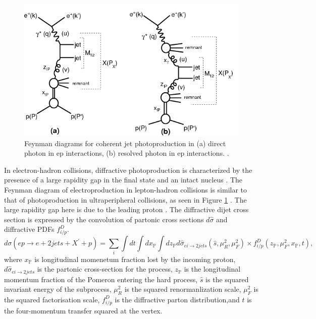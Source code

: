 \begin{figure}[]
\begin{centering}
\includegraphics[width=6in]{Chapter1/importfigs/h1_2015_feyn.png}
\par\end{centering}
\caption{Feynman diagrams for coherent jet photoproduction in (a) direct photon in ep interactions, (b) resolved photon in ep interactions. \cite{Andreev:2015cwa}. \label{fig:feynmanUPC1}}
\end{figure}

In electron-hadron collisions, diffractive photoproduction is characterized by the presence of a large rapidity gap in the final state and an intact nucleus \cite{Frankfurt:2006tp,Alexa:2013xxa,Aktas:2006qs}. The Feynman diagram of electroproduction in lepton-hadron collisions is similar to that of photoproduction in ultraperipheral collisions, as seen in Figure \ref{fig:feynmanUPC1} \cite{Andreev:2015cwa}. The large rapidity gap here is due to the leading proton \cite{Aaron:2010aa}. The diffractive dijet cross section is expressed by the convolution of partonic cross sections $d\hat{\sigma}$ and diffractive PDFs $f^D_{i/p}$.
\begin{equation}
d\sigma (ep \rightarrow e + 2 jets + X^{'} + p) = \sum_{i} \int dt \int dx_\mathbb{P} \int dz_\mathbb{P}d\hat{\sigma}_{ei\rightarrow 2jets}(\hat{s},\mu^2_R,\mu^2_F)\times f^D_{i/p}(z_\mathbb{P},\mu^2_F,x_\mathbb{P},t) ,
\end{equation}
where $x_\mathbb{P}$ is longitudinal momenetum fraction lost by the incoming proton, $d\hat{\sigma}_{ei\rightarrow 2jets}$ is the partonic cross-section for the process, $z_\mathbb{P}$ is the longitudinal momentum fraction of the Pomeron entering the hard process, $\hat{s}$ is the squared invariant energy of the subprocess, $\mu^2_R$ is the squared renormanlization scale, $\mu^2_F$ is the squared factorisation scale, $f^D_{i/p}$ is the diffractive parton distribution,and $t$ is the four-momentum transfer squared at the vertex. 

